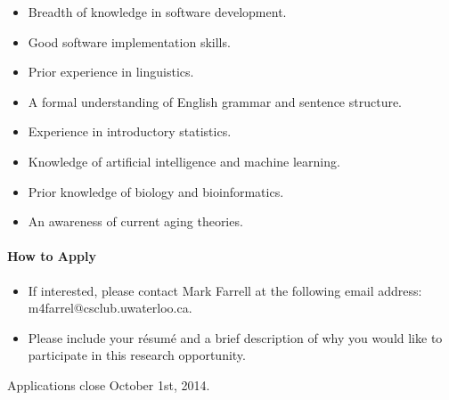 \documentclass[10pt, a4paper, notitlepage]{article}
\begin{document}
\begin{itemize}
\item Breadth of knowledge in software development.
\item Good software implementation skills.
\newline
\item Prior experience in linguistics.
\item A formal understanding of English grammar and sentence structure.
\newline
\item Experience in introductory statistics.
\item Knowledge of artificial intelligence and machine learning.
\newline
\item Prior knowledge of biology and bioinformatics.
\item An awareness of current aging theories.

\end{itemize}

\paragraph{How to Apply}

\begin{itemize}

\item If interested, please contact Mark Farrell at the following email address: m4farrel@csclub.uwaterloo.ca.
\item Please include your résumé and a brief description of why you would like to participate
in this research opportunity.
\end{itemize}

Applications close October 1st, 2014.
\end{document}
